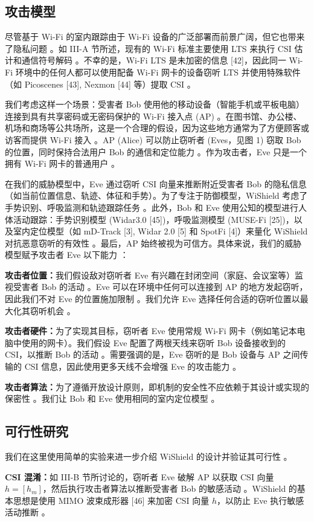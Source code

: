\documentclass[journal]{IEEEtran}
\begin{document}
\subsection{攻击模型}
尽管基于 Wi-Fi 的室内跟踪由于 Wi-Fi 设备的广泛部署而前景广阔，但它也带来了隐私问题 。如 III-A 节所述，现有的 Wi-Fi 标准主要使用 LTS 来执行 CSI 估计和通信符号解码 。不幸的是，Wi-Fi LTS 是未加密的信息 [42]，因此同一 Wi-Fi 环境中的任何人都可以使用配备 Wi-Fi 网卡的设备窃听 LTS 并使用特殊软件（如 Picoscenes [43], Nexmon [44] 等）提取 CSI 。

我们考虑这样一个场景：受害者 Bob 使用他的移动设备（智能手机或平板电脑）连接到具有共享密码或无密码保护的 Wi-Fi 接入点 (AP) 。在图书馆、办公楼、机场和商场等公共场所，这是一个合理的假设，因为这些地方通常为了方便顾客或访客而提供 Wi-Fi 接入 。AP (Alice) 可以防止窃听者 (Eves，见图 1) 窃取 Bob 的位置，同时保持合法用户 Bob 的通信和定位能力 。作为攻击者，Eve 只是一个拥有 Wi-Fi 网卡的普通用户 。

在我们的威胁模型中，Eve 通过窃听 CSI 向量来推断附近受害者 Bob 的隐私信息（如当前位置信息、轨迹、体征和手势）。为了专注于防御模型，WiShield 考虑了手势识别、呼吸监测和轨迹跟踪任务 。此外，Bob 和 Eve 使用公知的模型进行人体活动跟踪：手势识别模型 (Widar3.0 [45])，呼吸监测模型 (MUSE-Fi [25])，以及室内定位模型（如 mD-Track [3], Widar 2.0 [5] 和 SpotFi [4]）来量化 WiShield 对抗恶意窃听的有效性 。最后，AP 始终被视为可信方。具体来说，我们的威胁模型赋予攻击者 Eve 以下能力 ：

\textbf{攻击者位置：}我们假设敌对窃听者 Eve 有兴趣在封闭空间（家庭、会议室等）监视受害者 Bob 的活动 。Eve 可以在环境中任何可以连接到 AP 的地方发起窃听，因此我们不对 Eve 的位置施加限制 。我们允许 Eve 选择任何合适的窃听位置以最大化其窃听机会 。

\textbf{攻击者硬件：}为了实现其目标，窃听者 Eve 使用常规 Wi-Fi 网卡（例如笔记本电脑中使用的网卡）。我们假设 Eve 配置了两根天线来窃听 Bob 设备接收到的 CSI，以推断 Bob 的活动 。需要强调的是，Eve 窃听的是 Bob 设备与 AP 之间传输的 CSI 信息，因此使用更多天线不会增强 Eve 的攻击能力 。

\textbf{攻击者算法：}为了遵循开放设计原则，即机制的安全性不应依赖于其设计或实现的保密性 。我们让 Bob 和 Eve 使用相同的室内定位模型 。

\subsection{可行性研究}
我们在这里使用简单的实验来进一步介绍 WiShield 的设计并验证其可行性 。

\textbf{CSI 混淆：}如 III-B 节所讨论的，窃听者 Eve 破解 AP 以获取 CSI 向量 $h=[h_{m}]$，然后执行攻击者算法以推断受害者 Bob 的敏感活动 。WiShield 的基本思想是使用 MIMO 波束成形器 [46] 来加密 CSI 向量 $h$，以防止 Eve 执行敏感活动推断 。
\end{document}
